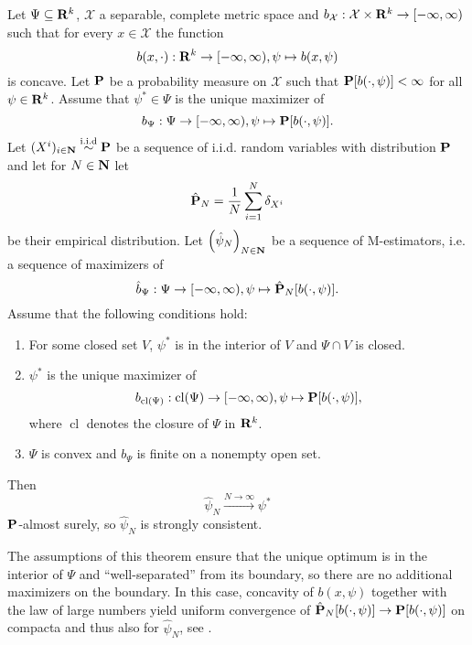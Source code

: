 \begin{theorem}
    \label{thm:haberman-consistent}
    Let $\Psi \subseteq \R^{k}$, $\mathcal X$ a separable, complete metric space and $b_{\mathcal X}: \mathcal X \times \R^{k} \to [- \infty, \infty )$ such that for every $x \in \mathcal X$ the function $$b(x, \cdot): \R^{k} \to [-\infty, \infty), \psi \mapsto b(x, \psi)$$ is concave. Let $\P$ be a probability measure on $\mathcal X$ such that $\P [b(\cdot, \psi)] < \infty$  for all $\psi \in \R^{k}$. Assume that $\psi^{\ast} \in \Psi$ is the unique maximizer of 
    $$
    b_{\Psi}: \Psi \to [-\infty, \infty), \psi \mapsto \P [b(\cdot,\psi)].
    $$ 
    Let $(X^{i})_{i \in \N} \iid \P$ be a sequence of i.i.d. random variables with distribution $\P$ and let for $N \in \N$ let $$\hat \P_{N} = \frac{1}{N} \sum_{i = 1}^N \delta_{X^{i}}$$ be their empirical distribution. Let $\left(\hat\psi_{N}\right)_{N \in \N}$ be a sequence of M-estimators, i.e. a sequence of maximizers of
    $$
    \hat b_{\Psi}: \Psi \to [-\infty, \infty), \psi \mapsto \hat \P_{N} [b(\cdot, \psi)].
    $$
    Assume that the following conditions hold:
    \begin{enumerate}[label=(C\arabic*),ref=(C\arabic*)]
        \item\label{it:C1} For some closed set $V$, $\psi^{\ast}$ is in the interior of $V$ and $\Psi \cap V$ is closed. 
        \item\label{it:C2} $\psi^{\ast}$ is the unique maximizer of $$b_{\operatorname{cl} (\Psi)}: \operatorname{cl} (\Psi) \to [-\infty, \infty), \psi \mapsto \P [b(\cdot, \psi)],$$ where $ \operatorname{cl}$ denotes the closure of $\Psi$ in $\R^{k}$.
        \item\label{it:C3} $\Psi$ is convex and $b_{\Psi}$ is finite on a nonempty open set.
    \end{enumerate}

    Then $$\hat \psi_{N} \stackrel{N \to \infty}\longrightarrow \psi^{\ast}$$ $\P$-almost surely, so $\hat\psi_{N}$ is strongly consistent.
\end{theorem}

The assumptions of this theorem ensure that the unique optimum is in the interior of $\Psi$ and ``{}well-separated''{} from its boundary, so there are no additional maximizers on the boundary. In this case, concavity of $b(x, \psi)$ together with the law of large numbers yield uniform convergence of $\hat \P_{N} [b(\cdot, \psi)] \to \P [b(\cdot, \psi)]$ on compacta and thus also for $\hat\psi_{N}$, see \citep[pp. 1652]{Haberman1989Concavity}.

